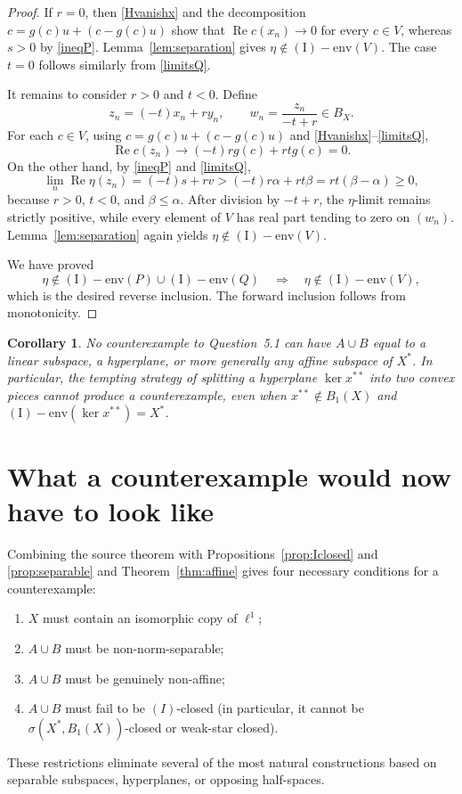 \documentclass[11pt]{article}
\newtheorem{corollary}[theorem]{Corollary}
\theoremstyle{remark}
\newcommand{\Ienv}{\operatorname{(I)\!\!-env}}
\newcommand{\Ree}{\operatorname{Re}}
\begin{document}
\begin{proof}
If $r=0$, then \eqref{Hvanishx} and the decomposition
$c=g(c)u+(c-g(c)u)$ show that $\Ree c(x_n)\to0$ for every $c\in V$, whereas
$s>0$ by \eqref{ineqP}.  Lemma~\ref{lem:separation} gives
$\eta\notin\Ienv(V)$.  The case $t=0$ follows similarly from
\eqref{limitsQ}.

It remains to consider $r>0$ and $t<0$.  Define
\[
 z_n=(-t)x_n+r y_n,
 \qquad
 w_n=\frac{z_n}{-t+r}\in B_X.
\]
For each $c\in V$, using $c=g(c)u+(c-g(c)u)$ and
\eqref{Hvanishx}--\eqref{limitsQ},
\[
 \Ree c(z_n)\longrightarrow (-t)r g(c)+rt g(c)=0.
\]
On the other hand, by \eqref{ineqP} and \eqref{limitsQ},
\[
 \lim_n\Ree\eta(z_n)
 =(-t)s+rv
 >(-t)r\alpha+rt\beta
 =rt(\beta-\alpha)\geq0,
\]
because $r>0$, $t<0$, and $\beta\leq\alpha$.  After division by
$-t+r$, the $\eta$-limit remains strictly positive, while every element of
$V$ has real part tending to zero on $(w_n)$.  Lemma~\ref{lem:separation}
again yields $\eta\notin\Ienv(V)$.

We have proved
\[
 \eta\notin\Ienv(P)\cup\Ienv(Q)
 \quad\Longrightarrow\quad
 \eta\notin\Ienv(V),
\]
which is the desired reverse inclusion.  The forward inclusion follows from
monotonicity.
\end{proof}

\begin{corollary}
No counterexample to Question~5.1 can have $A\cup B$ equal to a linear
subspace, a hyperplane, or more generally any affine subspace of $X^*$.
In particular, the tempting strategy of splitting a hyperplane
$\ker x^{**}$ into two convex pieces cannot produce a counterexample, even
when $x^{**}\notin B_1(X)$ and $\Ienv(\ker x^{**})=X^*$.
\end{corollary}

\section{What a counterexample would now have to look like}

Combining the source theorem with Propositions~\ref{prop:Iclosed} and
\ref{prop:separable} and Theorem~\ref{thm:affine} gives four necessary
conditions for a counterexample:
\begin{enumerate}[label=\textup{(\roman*)},leftmargin=2.4em]
\item $X$ must contain an isomorphic copy of $\ell^1$;
\item $A\cup B$ must be non-norm-separable;
\item $A\cup B$ must be genuinely non-affine;
\item $A\cup B$ must fail to be $(I)$-closed (in particular, it cannot be
$\sigma(X^*,B_1(X))$-closed or weak-star closed).
\end{enumerate}
These restrictions eliminate several of the most natural constructions
based on separable subspaces, hyperplanes, or opposing half-spaces.
\end{document}
